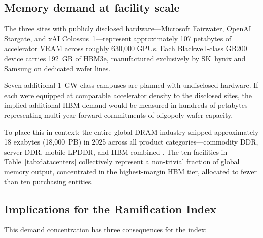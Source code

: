\documentclass[12pt]{article}
\theoremstyle{definition}
\begin{document}
\subsection{Memory demand at facility scale}

The three sites with publicly disclosed hardware---Microsoft Fairwater, OpenAI Stargate, and xAI Colossus~1---represent approximately 107 petabytes of accelerator VRAM across roughly 630{,}000 GPUs. Each Blackwell-class GB200 device carries 192~GB of HBM3e, manufactured exclusively by SK~hynix and Samsung on dedicated wafer lines.

Seven additional 1~GW-class campuses are planned with undisclosed hardware. If each were equipped at comparable accelerator density to the disclosed sites, the implied additional HBM demand would be measured in hundreds of petabytes---representing multi-year forward commitments of oligopoly wafer capacity.

To place this in context: the entire global DRAM industry shipped approximately 18 exabytes (18{,}000~PB) in 2025 across all product categories---commodity DDR, server DDR, mobile LPDDR, and HBM combined \cite{TrendForce2025AI}. The ten facilities in Table~\ref{tab:datacenters} collectively represent a non-trivial fraction of global memory output, concentrated in the highest-margin HBM tier, allocated to fewer than ten purchasing entities.

\subsection{Implications for the Ramification Index}

This demand concentration has three consequences for the index:
\end{document}
